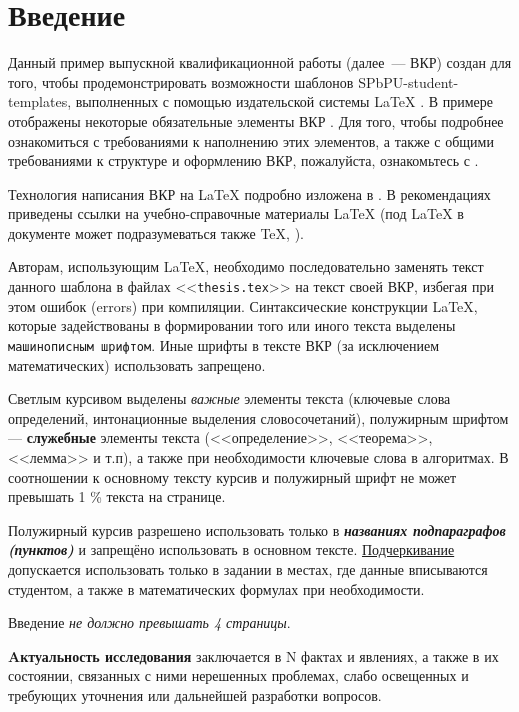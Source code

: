 \chapter*{Введение} %

Данный пример выпускной квалификационной работы (далее~--- ВКР) создан для того, чтобы продемонстрировать возможности шаблонов SPbPU-student-templates, выполненных с помощью издательской системы \LaTeX{} \cite{spbpu-student-thesis-template}. В примере отображены некоторые обязательные элементы ВКР \cite{spbpu-student-thesis-specification}. Для того, чтобы подробнее ознакомиться с требованиями к наполнению этих элементов, а также с общими требованиями к структуре и оформлению ВКР, пожалуйста, ознакомьтесь с  \cite{spbpu-student-thesis-template-author-guide,spbpu-student-thesis-specification}.


Технология написания ВКР на \LaTeX{} подробно изложена в \cite{spbpu-student-thesis-template-author-guide}. В рекомендациях приведены ссылки на учебно-справочные материалы \LaTeX{} (под \LaTeX{} в документе может подразумеваться также \TeX, \LaTeXe).


Авторам, использующим \LaTeX{}, необходимо последовательно заменять текст данного шаблона в файлах <<\verb|thesis.tex|>> на текст своей ВКР, избегая при этом ошибок (errors) при компиляции. Синтаксические конструкции \LaTeX, которые задействованы в формировании того или иного текста выделены \texttt{машинописным шрифтом}. Иные шрифты в тексте ВКР (за исключением математических) использовать запрещено. 

Светлым курсивом выделены \textit{важные} элементы текста (ключевые слова определений, интонационные выделения словосочетаний), полужирным шрифтом --- \textbf{служебные} элементы текста (<<определение>>, <<теорема>>, <<лемма>> и т.п), а также при необходимости ключевые слова в алгоритмах. В соотношении к основному тексту курсив и полужирный шрифт не может превышать 1 \% текста на странице.
 
Полужирный курсив разрешено использовать только в \textbf{\textit{названиях подпараграфов (пунктов)}} и запрещёно использовать в основном тексте. 
\uline{Подчеркивание} допускается использовать только в задании в местах, где данные вписываются студентом, а также в математических формулах при необходимости.

Введение \textit{не должно превышать 4 страницы}. 


\textbf{Aктуальность исследования} заключается в N фактах и явлениях,  а также в их состоянии, связанных с ними нерешенных проблемах, слабо освещенных и требующих уточнения или дальнейшей разработки вопросов. 

